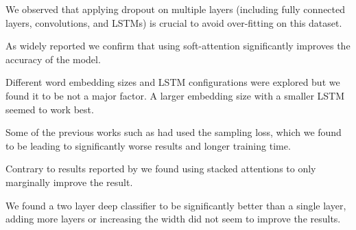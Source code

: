 \documentclass[10pt,twocolumn,letterpaper]{article}
\begin{document}
We observed that applying dropout on multiple layers (including fully connected layers, convolutions, and LSTMs) is crucial to avoid over-fitting on this dataset.

As widely reported we confirm that using soft-attention significantly improves the accuracy of the model. 

Different word embedding sizes and LSTM configurations were explored but we found it to be not a major factor. A larger embedding size with a smaller LSTM seemed to work best.

Some of the previous works such as \cite{Fukui2016MultimodalCB} had used the sampling loss, which we found to be leading to significantly worse results and longer training time.

Contrary to results reported by \cite{Yang2016StackedAN} we found using stacked attentions to only marginally improve the result.

We found a two layer deep classifier to be significantly better than a single layer, adding more layers or increasing the width did not seem to improve the results. 
\end{document}
